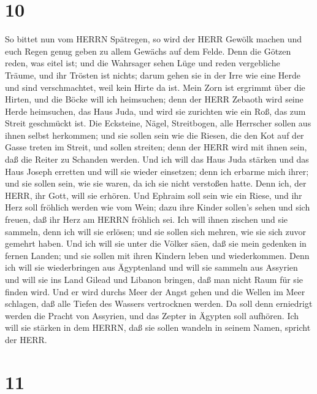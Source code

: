 \hypertarget{section-9}{%
\section{10}\label{section-9}}

 So bittet nun vom HERRN Spätregen, so wird der HERR Gewölk
machen und euch Regen genug geben zu allem Gewächs auf dem Felde.
 Denn die Götzen reden, was eitel ist; und die Wahrsager
sehen Lüge und reden vergebliche Träume, und ihr Trösten ist nichts;
darum gehen sie in der Irre wie eine Herde und sind verschmachtet, weil
kein Hirte da ist.  Mein Zorn ist ergrimmt über die Hirten,
und die Böcke will ich heimsuchen; denn der HERR Zebaoth wird seine
Herde heimsuchen, das Haus Juda, und wird sie zurichten wie ein Roß, das
zum Streit geschmückt ist.  Die Ecksteine, Nägel,
Streitbogen, alle Herrscher sollen aus ihnen selbst herkommen;
 und sie sollen sein wie die Riesen, die den Kot auf der
Gasse treten im Streit, und sollen streiten; denn der HERR wird mit
ihnen sein, daß die Reiter zu Schanden werden.  Und ich will
das Haus Juda stärken und das Haus Joseph erretten und will sie wieder
einsetzen; denn ich erbarme mich ihrer; und sie sollen sein, wie sie
waren, da ich sie nicht verstoßen hatte. Denn ich, der HERR, ihr Gott,
will sie erhören.  Und Ephraim soll sein wie ein Riese, und
ihr Herz soll fröhlich werden wie vom Wein; dazu ihre Kinder sollen's
sehen und sich freuen, daß ihr Herz am HERRN fröhlich sei. 
Ich will ihnen zischen und sie sammeln, denn ich will sie erlösen; und
sie sollen sich mehren, wie sie sich zuvor gemehrt haben. 
Und ich will sie unter die Völker säen, daß sie mein gedenken in fernen
Landen; und sie sollen mit ihren Kindern leben und wiederkommen.
 Denn ich will sie wiederbringen aus Ägyptenland und will
sie sammeln aus Assyrien und will sie ins Land Gilead und Libanon
bringen, daß man nicht Raum für sie finden wird.  Und er
wird durchs Meer der Angst gehen und die Wellen im Meer schlagen, daß
alle Tiefen des Wassers vertrocknen werden. Da soll denn erniedrigt
werden die Pracht von Assyrien, und das Zepter in Ägypten soll aufhören.
 Ich will sie stärken in dem HERRN, daß sie sollen wandeln
in seinem Namen, spricht der HERR.

\hypertarget{section-10}{%
\section{11}\label{section-10}}

